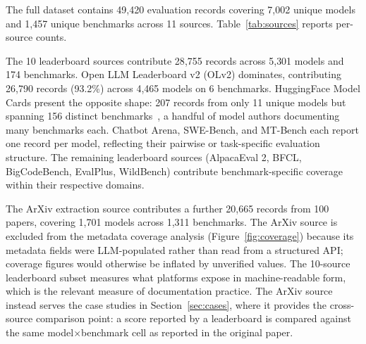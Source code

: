\documentclass[11pt]{article}
\begin{document}
%
%


The full dataset contains 49{,}420 evaluation records covering 7{,}002 unique
models and 1{,}457 unique benchmarks across 11 sources.
Table~\ref{tab:sources} reports per-source counts.

The 10 leaderboard sources contribute 28{,}755 records across 5{,}301 models
and 174 benchmarks. Open LLM Leaderboard v2 (OLv2) dominates, contributing
26{,}790 records (93.2\%) across 4{,}465 models on 6 benchmarks.
HuggingFace Model Cards present the opposite shape: 207 records from only
11 unique models but spanning 156 distinct benchmarks~, a handful of model
authors documenting many benchmarks each. Chatbot Arena, SWE-Bench, and
MT-Bench each report one record per model, reflecting their pairwise or
task-specific evaluation structure. The remaining leaderboard sources
(AlpacaEval 2, BFCL, BigCodeBench, EvalPlus, WildBench) contribute
benchmark-specific coverage within their respective domains.

The ArXiv extraction source contributes a further 20{,}665 records from 100
papers, covering 1{,}701 models across 1{,}311 benchmarks. The ArXiv source
is excluded from the metadata coverage analysis (Figure~\ref{fig:coverage})
because its metadata fields were LLM-populated rather than read from a
structured API; coverage figures would otherwise be inflated by unverified
values. The 10-source leaderboard subset measures what platforms expose in
machine-readable form, which is the relevant measure of documentation
practice. The ArXiv source instead serves the case studies in
Section~\ref{sec:cases}, where it provides the cross-source comparison
point: a score reported by a leaderboard is compared against the same
model$\times$benchmark cell as reported in the original paper.
\end{document}
